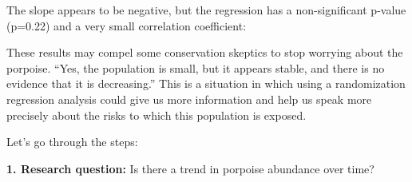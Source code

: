 \documentclass[]{book}
\newenvironment{Shaded}{\begin{snugshade}}{\end{snugshade}}
\newcommand{\DataTypeTok}[1]{\textcolor[rgb]{0.13,0.29,0.53}{#1}}
\newcommand{\DecValTok}[1]{\textcolor[rgb]{0.00,0.00,0.81}{#1}}
\newcommand{\ErrorTok}[1]{\textcolor[rgb]{0.64,0.00,0.00}{\textbf{#1}}}
\newcommand{\FloatTok}[1]{\textcolor[rgb]{0.00,0.00,0.81}{#1}}
\newcommand{\KeywordTok}[1]{\textcolor[rgb]{0.13,0.29,0.53}{\textbf{#1}}}
\newcommand{\NormalTok}[1]{#1}
\newcommand{\OperatorTok}[1]{\textcolor[rgb]{0.81,0.36,0.00}{\textbf{#1}}}
\newcommand{\StringTok}[1]{\textcolor[rgb]{0.31,0.60,0.02}{#1}}
\begin{document}
The slope appears to be negative, but the regression has a non-significant p-value (p=0.22) and a very small correlation coefficient:

\begin{Shaded}
\end{Shaded}

These results may compel some conservation skeptics to stop worrying about the porpoise. ``Yes, the population is small, but it appears stable, and there is no evidence that it is decreasing.'' This is a situation in which using a randomization regression analysis could give us more information and help us speak more precisely about the risks to which this population is exposed.

Let's go through the steps:

\textbf{1. Research question:} Is there a trend in porpoise abundance over time?
\end{document}
